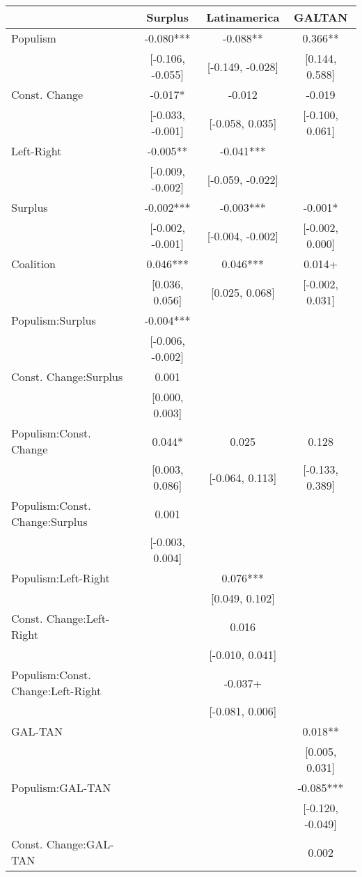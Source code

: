 \begin{table}
\centering\centering\centering
\begin{tabular}[t]{lccc}
\toprule
  & Surplus & Latinamerica & GALTAN\\
\midrule
Populism & -0.080*** & -0.088** & 0.366**\\
 & {}[-0.106, -0.055] & {}[-0.149, -0.028] & {}[0.144, 0.588]\\
Const. Change & -0.017* & -0.012 & -0.019\\
 & {}[-0.033, -0.001] & {}[-0.058, 0.035] & {}[-0.100, 0.061]\\
Left-Right & -0.005** & -0.041*** & \\
 & {}[-0.009, -0.002] & {}[-0.059, -0.022] & \\
Surplus & -0.002*** & -0.003*** & -0.001*\\
 & {}[-0.002, -0.001] & {}[-0.004, -0.002] & {}[-0.002, 0.000]\\
Coalition & 0.046*** & 0.046*** & 0.014+\\
 & {}[0.036, 0.056] & {}[0.025, 0.068] & {}[-0.002, 0.031]\\
Populism:Surplus & -0.004*** &  & \\
 & {}[-0.006, -0.002] &  & \\
Const. Change:Surplus & 0.001 &  & \\
 & {}[0.000, 0.003] &  & \\
Populism:Const. Change & 0.044* & 0.025 & 0.128\\
 & {}[0.003, 0.086] & {}[-0.064, 0.113] & {}[-0.133, 0.389]\\
Populism:Const. Change:Surplus & 0.001 &  & \\
 & {}[-0.003, 0.004] &  & \\
Populism:Left-Right &  & 0.076*** & \\
 &  & {}[0.049, 0.102] & \\
Const. Change:Left-Right &  & 0.016 & \\
 &  & {}[-0.010, 0.041] & \\
Populism:Const. Change:Left-Right &  & -0.037+ & \\
 &  & {}[-0.081, 0.006] & \\
GAL-TAN &  &  & 0.018**\\
 &  &  & {}[0.005, 0.031]\\
Populism:GAL-TAN &  &  & -0.085***\\
 &  &  & {}[-0.120, -0.049]\\
Const. Change:GAL-TAN &  &  & 0.002\\

\end{tabular}
\end{table}
